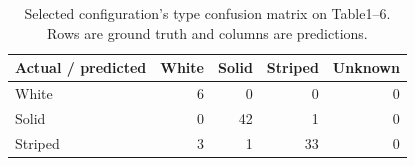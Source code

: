 \begin{table}[htbp]
\centering
\small
\caption{Selected configuration's type confusion matrix on Table1--6. Rows are ground truth and columns are predictions.}
\label{tab:recognition-search-confusion}
\begin{tabular}{lrrrr}
\toprule
Actual / predicted & White & Solid & Striped & Unknown \\
\midrule
White & 6 & 0 & 0 & 0 \\
Solid & 0 & 42 & 1 & 0 \\
Striped & 3 & 1 & 33 & 0 \\
\bottomrule
\end{tabular}
\end{table}
\FloatBarrier

